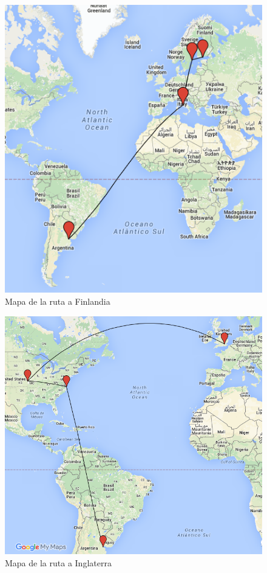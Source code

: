 \begin{figure}[H]
  \begin{center}
    \includegraphics[scale=1]{graficos/finlandia.PNG}
	\caption{Mapa de la ruta a Finlandia}
    \label{fig:mapa-finlandia}  
  \end{center}
\end{figure}

\begin{figure}[H]
  \begin{center}
    \includegraphics[scale=1]{graficos/inglaterra.PNG}
	\caption{Mapa de la ruta a Inglaterra}
    \label{fig:mapa-inglaterra}  
  \end{center}
\end{figure}